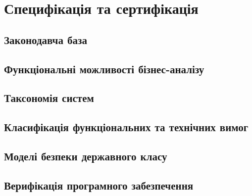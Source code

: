 \chapter{Специфікація та сертифікація}

\section{Законодавча база}

\section{Функціональні можливості бізнес-аналізу}

\section{Таксономія систем}

\section{Класифікація функціональних та технічних вимог}

\section{Моделі безпеки державного класу}

\section{Верифікація програмного забезпечення}

